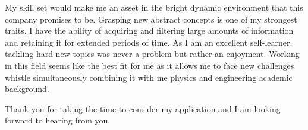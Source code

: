 \documentclass[10pt,stdletter,dateno,sigleft]{newlfm} %
\begin{document}
\begin{newlfm}
My skill set  would make me an asset in the bright dynamic environment that this company promises to be. Grasping new abstract concepts is one of my strongest traits. I have the ability of acquiring and filtering large amounts of information and retaining it for extended periods of time. As I am an excellent self-learner, tackling hard new topics was never a problem but rather an enjoyment. Working in this field seems like the best fit for me as it allows me to face new challenges whistle simultaneously combining it with me physics and engineering academic background.


Thank you for taking the time to consider my application and I am looking forward to hearing from you.


\end{newlfm}
\end{document}
